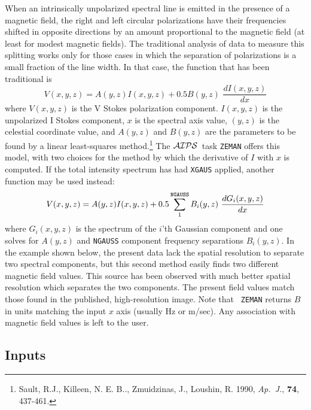 \documentclass[twoside]{article}
\newcommand{\AIPS}{{$\cal AIPS\/$}}
\begin{document}
When an intrinsically unpolarized spectral line is emitted in the
presence of a magnetic field, the right and left circular
polarizations have their frequencies shifted in opposite directions by
an amount proportional to the magnetic field (at least for modest
magnetic fields).  The traditional analysis of data to measure this
splitting works only for those cases in which the separation of
polarizations is a small fraction of the line width.  In that case,
the function that has been traditional is
\begin{equation}
     V(x,y,z) = A(y,z) I(x,y,z) + 0.5 B(y,z)\,\, \frac{dI(x,y,z)}{dx}
\label{eqn:Zeman}
\end{equation}
where $V(x,y,z)$ is the V Stokes polarization component. $I(x,y,z)$ is
the unpolarized I Stokes component, $x$ is the spectral axis value,
$(y,z)$ is the celestial coordinate value, and $A(y,z)$ and $B(y,z)$
are the parameters to be found by a linear least-squares
method.\footnote{Sault, R.J., Killeen, N. E. B.., Zmuidzinas, J.,
  Loushin, R. 1990, {\it Ap.~J.}, {\bf 74}, 437-461.}  The \AIPS\ task
{\tt ZEMAN} offers this model, with two choices for the method by
which the derivative of $I$ with $x$ is computed.  If the total
intensity spectrum has had {\tt XGAUS} applied, another function may
be used instead:
\begin{equation}
     V(x,y,z) = A(y,z) I(x,y,z) + 0.5 \sum_1^{\tt NGAUSS} B_i(y,z)\,
        \,\frac{dG_i(x,y,z)}{dx}
\label{eqn:ZemanGaus}
\end{equation}
where $G_i(x,y,z)$ is the spectrum of the $i$'th Gaussian component
and one solves for $A(y,z)$ and {\tt NGAUSS} component frequency
separations $B_i(y,z)$.  In the example shown below, the present data
lack the spatial resolution to separate two spectral components, but
this second method easily finds two different magnetic field values.
This source has been observed with much better spatial resolution
which separates the two components.  The present field values match
those found in the published, high-resolution image.  Note that {\tt
  ZEMAN} returns $B$ in units matching the input $x$ axis (usually Hz
or m/sec).  Any association with magnetic field values is left to the
user.

\subsection{Inputs}
\end{document}
